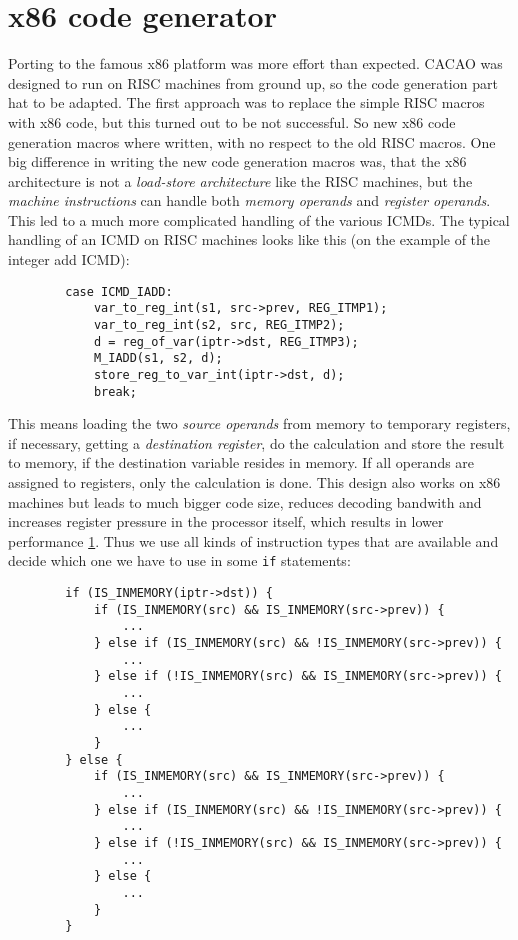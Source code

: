 \section{x86 code generator}

Porting to the famous x86 platform was more effort than
expected. CACAO was designed to run on RISC machines from ground up,
so the code generation part hat to be adapted. The first approach was
to replace the simple RISC macros with x86 code, but this turned out
to be not successful. So new x86 code generation macros where written,
with no respect to the old RISC macros. One big difference in writing
the new code generation macros was, that the x86 architecture is not a
\textit{load-store architecture} like the RISC machines, but the
\textit{machine instructions} can handle both \textit{memory operands}
and \textit{register operands}. This led to a much more complicated
handling of the various ICMDs. The typical handling of an ICMD on RISC
machines looks like this (on the example of the integer add ICMD):

\begin{verbatim}
        case ICMD_IADD:
            var_to_reg_int(s1, src->prev, REG_ITMP1);
            var_to_reg_int(s2, src, REG_ITMP2);
            d = reg_of_var(iptr->dst, REG_ITMP3);
            M_IADD(s1, s2, d);
            store_reg_to_var_int(iptr->dst, d);
            break;
\end{verbatim}

This means loading the two \textit{source operands} from memory to
temporary registers, if necessary, getting a \textit{destination
register}, do the calculation and store the result to memory, if the
destination variable resides in memory. If all operands are assigned
to registers, only the calculation is done. This design also works on
x86 machines but leads to much bigger code size, reduces decoding
bandwith and increases register pressure in the processor itself,
which results in lower performance \ref{}. Thus we use all kinds of
instruction types that are available and decide which one we have to
use in some \texttt{if} statements:

\begin{verbatim}
        if (IS_INMEMORY(iptr->dst)) {
            if (IS_INMEMORY(src) && IS_INMEMORY(src->prev)) {
                ...
            } else if (IS_INMEMORY(src) && !IS_INMEMORY(src->prev)) {
                ...
            } else if (!IS_INMEMORY(src) && IS_INMEMORY(src->prev)) {
                ...
            } else {
                ...
            }
        } else {
            if (IS_INMEMORY(src) && IS_INMEMORY(src->prev)) {
                ...
            } else if (IS_INMEMORY(src) && !IS_INMEMORY(src->prev)) {
                ...
            } else if (!IS_INMEMORY(src) && IS_INMEMORY(src->prev)) {
                ...
            } else {
                ...
            }
        }
\end{verbatim}

